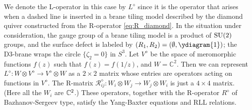 We denote the L-operator in this case by $L^{\diamond}$ since
it is the operator that arises when a dashed line is inserted in a
brane tiling model described by the diamond quiver constructed from
the R-operator \eqref{eq:R_diamond}. In the situation under consideration,
the gauge group of a brane tiling model is a product of $\mathrm{SU}(2)$ groups,
and the surface defect is labeled by $( R_{1},R_{2} )=( \emptyset, \ydiagram{1} )$;
the D3-brane wraps the circle $\{\zeta_{2}=0\}$ in $S^{3}$. Let
$V^{\diamond}$ be the space of meromorphic functions $f(z)$
such that $f(z)=f(1/z)$, and $W=\mathbb{C}^{2}$. Then we can represent
$L^{\diamond}:W\otimes V^{\diamond}\rightarrow V^{\diamond}\otimes W$
as a $2\times2$ matrix whose entries are operators acting on functions
in $V^{\diamond}$. The R-matrix $\mathcal{R}_{ij}^{\diamond}:W_{i}\otimes W_{j}\rightarrow W_{j}\otimes W_{i}$
is just a $4\times4$ matrix.
(Here all the $W_i$ are $\mathbb{C}^2$.)
These operators, together with the R-operator
$R^{\diamond}$ of Bazhanov-Sergeev type,
satisfy the Yang-Baxter equations and RLL relations.

